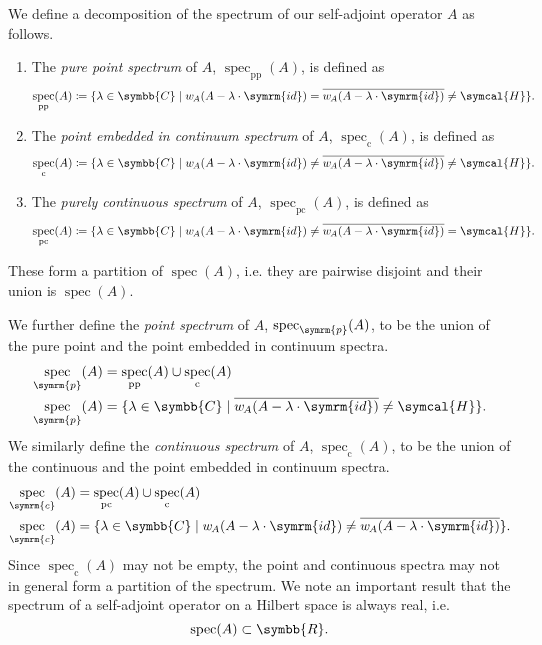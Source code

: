 \documentclass[12pt, a4 paper]{article}
\theoremstyle{definition}
\newcommand{\rr}{\symbb{R}}
\newcommand{\cc}{\symbb{C}}
\newcommand{\hilbert}{\symcal{H}}
\newcommand{\identity}{\symrm{id}}
\newcommand{\w}{w\kern-1pt}
\DeclareMathOperator{\spec}{spec}
\begin{document}
    We define a decomposition of the spectrum of our self-adjoint operator $A$ as follows.
    \begin{enumerate}
        \item The \textit{pure point spectrum} of $A$, $\spec_\text{pp}(A)$, is defined as
        \[
        \spec_\text{pp}(A) \coloneq \{\lambda \in \cc \mid \w_A(A - \lambda \cdot \identity) = \overline{\w_A(A - \lambda \cdot \identity)} \neq \hilbert\}.
        \]
        \item The \textit{point embedded in continuum spectrum} of $A$, $\spec_{\text{c}}(A)$, is defined as
        \[
        \spec_{\text{c}}(A) \coloneq \{\lambda \in \cc \mid \w_A(A - \lambda \cdot \identity) \neq \overline{\w_A(A - \lambda \cdot \identity)} \neq \hilbert\}.
        \]
        \item The \textit{purely continuous spectrum} of $A$, $\spec_\text{pc}(A)$, is defined as
        \[
        \spec_\text{pc}(A) \coloneq \{\lambda \in \cc \mid \w_A(A - \lambda \cdot \identity) \neq \overline{\w_A(A - \lambda \cdot \identity)} = \hilbert\}.
        \]
    \end{enumerate}
    These form a partition of $\spec(A)$, i.e. they are pairwise disjoint and their union is $\spec(A)$.

    We further define the \textit{point spectrum} of $A$, $\spec_{\symrm{p}}(A)$, to be the union of the pure point and the point embedded in continuum spectra.
    \begin{align*}
        \spec_{\symrm{p}}(A) &=  \spec_\text{pp}(A) \cup \spec_{\text{c}}(A)\\
        \spec_{\symrm{p}}(A) &= \{\lambda \in \cc \mid\overline{\w_A(A - \lambda \cdot \identity)} \neq \hilbert\}.
    \end{align*}
    We similarly define the \textit{continuous spectrum} of $A$, $\spec_\text{c} (A)$, to be the union of the continuous and the point embedded in continuum spectra.
    \begin{align*}
        \spec_{\symrm{c}}(A) &=  \spec_\text{pc}(A) \cup \spec_{\text{c}}(A)\\
        \spec_{\symrm{c}}(A) &= \{\lambda \in \cc \mid \w_A(A - \lambda \cdot \identity) \neq \overline{\w_A(A - \lambda \cdot \identity)}\}.
    \end{align*}
    Since $\spec_{\text{c}}(A)$ may not be empty, the point and continuous spectra may not in general form a partition of the spectrum. We note an important result that the spectrum of a self-adjoint operator on a Hilbert space is always real, i.e.
    \[
    \spec(A) \subset \rr.
    \]
\end{document}
